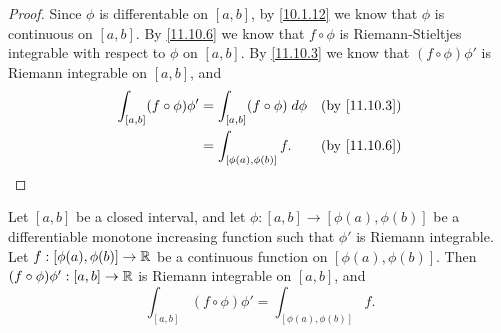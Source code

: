 \begin{proof}
  Since \(\phi\) is differentable on \([a, b]\), by \cref{10.1.12} we know that \(\phi\) is continuous on \([a, b]\).
  By \cref{11.10.6} we know that \(f \circ \phi\) is Riemann-Stieltjes integrable with respect to \(\phi\) on \([a, b]\).
  By \cref{11.10.3} we know that \((f \circ \phi) \phi'\) is Riemann integrable on \([a, b]\), and
  \begin{align*}
    \int_{[a, b]} (f \circ \phi) \phi' & = \int_{[a, b]} (f \circ \phi) \; d \phi & \text{(by \cref{11.10.3})} \\
                                       & = \int_{[\phi(a), \phi(b)]} f.           & \text{(by \cref{11.10.6})}
  \end{align*}
\end{proof}

\begin{ac}\label{ac:11.10.1}
  Let \([a, b]\) be a closed interval, and let \(\phi : [a, b] \to [\phi(a), \phi(b)]\) be a differentiable monotone increasing function such that \(\phi'\) is Riemann integrable.
  Let \(f : [\phi(a), \phi(b)] \to \mathbb{R}\) be a continuous function on \([\phi(a), \phi(b)]\).
  Then \((f \circ \phi) \phi' : [a, b] \to \mathbb{R}\) is Riemann integrable on \([a, b]\), and
  \[
    \int_{[a, b]} (f \circ \phi) \phi' = \int_{[\phi(a), \phi(b)]} f.
  \]
\end{ac}

